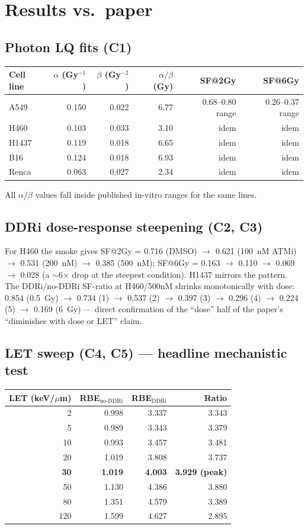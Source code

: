 \documentclass[11pt]{article}
\begin{document}
\section{Results vs.\ paper}

\subsection{Photon LQ fits (C1)}

\begin{tabular}{lrrrrr}
\toprule
Cell line & $\alpha$ (Gy$^{-1}$) & $\beta$ (Gy$^{-2}$) & $\alpha/\beta$ (Gy) & SF@2Gy & SF@6Gy \\
\midrule
A549  & 0.150 & 0.022 & 6.77 & 0.68--0.80 range & 0.26--0.37 range \\
H460  & 0.103 & 0.033 & 3.10 & idem & idem \\
H1437 & 0.119 & 0.018 & 6.65 & idem & idem \\
B16   & 0.124 & 0.018 & 6.93 & idem & idem \\
Renca & 0.063 & 0.027 & 2.34 & idem & idem \\
\bottomrule
\end{tabular}

\noindent All $\alpha/\beta$ values fall inside published in-vitro ranges for the same lines.

\subsection{DDRi dose-response steepening (C2, C3)}

For H460 the smoke gives SF@2Gy = 0.716 (DMSO) $\to$ 0.621 (100~nM ATMi) $\to$ 0.531 (200~nM) $\to$
0.385 (500~nM); SF@6Gy = 0.163 $\to$ 0.110 $\to$ 0.069 $\to$ 0.028 (a $\sim$6$\times$ drop at the
steepest condition). H1437 mirrors the pattern. The DDRi/no-DDRi SF-ratio at H460/500nM shrinks
monotonically with dose: 0.854 (0.5~Gy) $\to$ 0.734 (1) $\to$ 0.537 (2) $\to$ 0.397 (3) $\to$ 0.296
(4) $\to$ 0.224 (5) $\to$ 0.169 (6~Gy) --- direct confirmation of the ``dose'' half of the paper's
``diminishes with dose or LET'' claim.

\subsection{LET sweep (C4, C5) --- headline mechanistic test}

\begin{tabular}{rrrr}
\toprule
LET (keV/$\mu$m) & RBE$_{\text{no-DDRi}}$ & RBE$_{\text{DDRi}}$ & Ratio \\
\midrule
  2   & 0.998 & 3.337 & 3.343 \\
  5   & 0.989 & 3.343 & 3.379 \\
 10   & 0.993 & 3.457 & 3.481 \\
 20   & 1.019 & 3.808 & 3.737 \\
 \textbf{30} & \textbf{1.019} & \textbf{4.003} & \textbf{3.929 (peak)} \\
 50   & 1.130 & 4.386 & 3.880 \\
 80   & 1.351 & 4.579 & 3.389 \\
120   & 1.599 & 4.627 & 2.895 \\
\bottomrule
\end{tabular}
\end{document}
